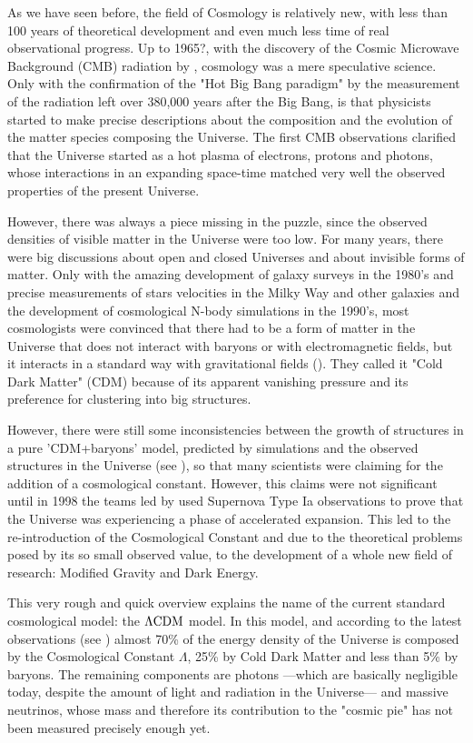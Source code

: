 As we have seen before, the field of Cosmology is relatively new, with less than 100 years of theoretical development
and even much less time of real observational progress.
Up to 1965?, with the discovery of the Cosmic Microwave Background (CMB) radiation by \cite{Penzias and Wilson},
cosmology was a mere speculative science. Only with the confirmation of the "Hot Big Bang paradigm" by the measurement of the radiation left over
380,000 years after the Big Bang, is that physicists started to make precise descriptions about the composition and 
the evolution of the matter species composing the Universe. The first CMB observations clarified that the Universe started
as a hot plasma of electrons, protons and photons, whose interactions in an expanding space-time matched very well the observed properties
of the present Universe.

However, there was always a piece missing in the puzzle, since the observed densities of visible matter in the Universe were too low.
For many years, there were big discussions about open and closed Universes and about invisible forms of matter.
Only with the amazing development of galaxy surveys in the 1980's and precise measurements of stars velocities in the Milky Way and other galaxies
and the development of cosmological N-body simulations in the 1990's, most cosmologists were convinced that there had to be a form of matter in the Universe
that does not interact with baryons or with electromagnetic fields, but it interacts in a standard way with gravitational fields (\cite{cite;
recent peebles, Dolag DM review, reviews, books}).
They called it "Cold Dark Matter" (CDM) because of its apparent vanishing pressure and its preference for clustering into big structures.

However, there were still some inconsistencies between the growth of structures in a pure 'CDM+baryons' model, predicted
by simulations and the observed structures in the Universe (see \cite{reviews Dolag, peacock}), so that many scientists were claiming for the addition
of a cosmological constant. However, this claims were not significant until in 1998 the teams led by \cite{Perlmutter and ..} used Supernova Type Ia
observations to prove that the Universe was experiencing a phase of accelerated expansion. This led to the re-introduction of the Cosmological Constant
and due to the theoretical problems posed by its so small observed value, to the development of a whole new 
field of research: Modified Gravity and Dark Energy.

This very rough and quick overview explains the name of the current standard cosmological model: the $\Lambda\mathrm{CDM}$ model. 
In this model, and according to the latest observations (see \cite{planck_collaboration_planck_2016-1})
 almost 70\% of the energy density of the Universe is composed by the Cosmological Constant
$\Lambda$, 25\% by Cold Dark Matter and less than 5\% by baryons. The remaining components are photons ---which are basically negligible today, despite the amount of light and radiation in the Universe--- and massive neutrinos,
whose mass and therefore its contribution to the "cosmic pie" has not been measured precisely enough yet.

